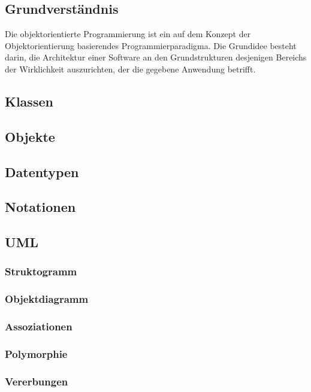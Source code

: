 \documentclass[12pt,a4paper]{article}
\begin{document}
\subsection{Grundverständnis}
    Die objektorientierte Programmierung ist ein auf dem Konzept der Objektorientierung basierendes
    Programmierparadigma. Die Grundidee besteht darin, die Architektur einer Software an den Grundstrukturen desjenigen
    Bereichs der Wirklichkeit auszurichten, der die gegebene Anwendung betrifft.

\subsection{Klassen}

\subsection{Objekte}

\subsection{Datentypen}

\subsection{Notationen}

\subsection{UML}
    \subsubsection{Struktogramm}

    \subsubsection{Objektdiagramm}

    \subsubsection{Assoziationen}

    \subsubsection{Polymorphie}

    \subsubsection{Vererbungen}
\end{document}
